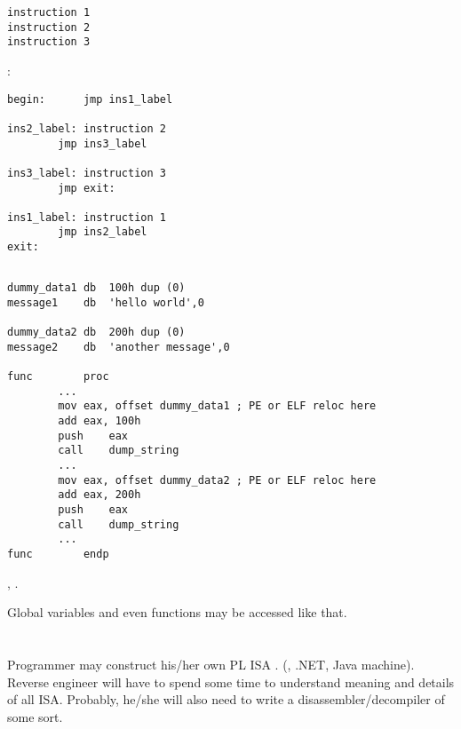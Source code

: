 \begin{lstlisting}
instruction 1
instruction 2
instruction 3
\end{lstlisting}

:

\begin{lstlisting}
begin:		jmp	ins1_label

ins2_label:	instruction 2
		jmp	ins3_label

ins3_label:	instruction 3
		jmp	exit:

ins1_label:	instruction 1
		jmp	ins2_label
exit:
\end{lstlisting}

\subsection{}

\begin{lstlisting}
dummy_data1	db	100h dup (0)
message1	db	'hello world',0

dummy_data2	db	200h dup (0)
message2	db	'another message',0

func		proc
		...
		mov	eax, offset dummy_data1 ; PE or ELF reloc here
		add	eax, 100h
		push	eax
		call	dump_string
		...
		mov	eax, offset dummy_data2 ; PE or ELF reloc here
		add	eax, 200h
		push	eax
		call	dump_string
		...
func		endp
\end{lstlisting}

\IDA{}   \AndENRU {}, 
.

{Global variables and even functions may be accessed like that}.

\section{}

{Programmer may construct his/her own} \ac{PL} \OrENRU \ac{ISA} .
(, .NET, Java machine).
Reverse engineer
{will have to spend some time to understand meaning and details of all} \ac{ISA}.
{Probably, he/she will also need to write a disassembler/decompiler of some sort}.

